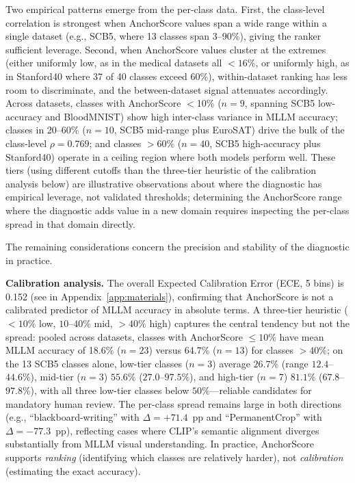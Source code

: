 \documentclass[a4paper,fleqn]{cas-sc}
\begin{document}
Two empirical patterns emerge from the per-class data. First, the class-level correlation is strongest when AnchorScore values span a wide range within a single dataset (e.g., SCB5, where 13 classes span 3--90\%), giving the ranker sufficient leverage. Second, when AnchorScore values cluster at the extremes (either uniformly low, as in the medical datasets all $<16\%$, or uniformly high, as in Stanford40 where 37 of 40 classes exceed 60\%), within-dataset ranking has less room to discriminate, and the between-dataset signal attenuates accordingly. Across datasets, classes with AnchorScore $<$10\% ($n=9$, spanning SCB5 low-accuracy and BloodMNIST) show high inter-class variance in MLLM accuracy; classes in 20--60\% ($n=10$, SCB5 mid-range plus EuroSAT) drive the bulk of the class-level $\rho=0.769$; and classes $>$60\% ($n=40$, SCB5 high-accuracy plus Stanford40) operate in a ceiling region where both models perform well. These tiers (using different cutoffs than the three-tier heuristic of the calibration analysis below) are illustrative observations about where the diagnostic has empirical leverage, not validated thresholds; determining the AnchorScore range where the diagnostic adds value in a new domain requires inspecting the per-class spread in that domain directly.

The remaining considerations concern the precision and stability of the diagnostic in practice.

\textbf{Calibration analysis.} The overall Expected Calibration Error (ECE, 5 bins) is 0.152 (see  in Appendix~\ref{app:materials}), confirming that AnchorScore is not a calibrated predictor of MLLM accuracy in absolute terms. A three-tier heuristic ($<10\%$ low, $10$--$40\%$ mid, $>40\%$ high) captures the central tendency but not the spread: pooled across datasets, classes with AnchorScore $\leq 10\%$ have mean MLLM accuracy of 18.6\% ($n=23$) versus 64.7\% ($n=13$) for classes $>40\%$; on the 13 SCB5 classes alone, low-tier classes ($n=3$) average $26.7\%$ (range $12.4$--$44.6\%$), mid-tier ($n=3$) $55.6\%$ ($27.0$--$97.5\%$), and high-tier ($n=7$) $81.1\%$ ($67.8$--$97.8\%$), with all three low-tier classes below $50\%$---reliable candidates for mandatory human review. The per-class spread remains large in both directions (e.g., ``blackboard-writing'' with $\Delta=+71.4$~pp and ``PermanentCrop'' with $\Delta=-77.3$~pp), reflecting cases where CLIP's semantic alignment diverges substantially from MLLM visual understanding. In practice, AnchorScore supports \emph{ranking} (identifying which classes are relatively harder), not \emph{calibration} (estimating the exact accuracy).
\end{document}
